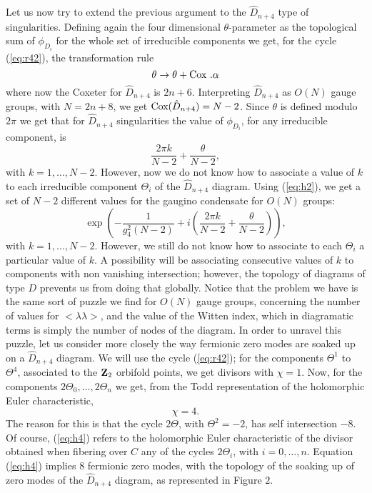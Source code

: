 Let us now try to extend the previous argument to the
$\hat{D}_{n+4}$ type of singularities. Defining again the four
dimensional $\theta$-parameter as the topological sum of
$\phi_{D_i}$ for the whole set of irreducible components we get,
for the cycle (\ref{eq:r42}), the transformation rule
\begin{equation}
\theta \rightarrow \theta + \hbox {Cox }. \alpha
\label{eq:h1}
\end{equation}
where now the Coxeter for $\hat{D}_{n+4}$ is $2n+6$. Interpreting
$\hat{D}_{n+4}$ as $O(N)$ gauge groups, with $N=2n+8$, we get
$\hbox {Cox}(\hat{D}_{n+4})=N-2$. Since $\theta$ is defined
modulo $2 \pi$ we get that for $\hat{D}_{n+4}$ singularities the
value of $\phi_{D_i}$, for any irreducible component, is
\begin{equation}
\frac {2 \pi k}{N-2} + \frac {\theta}{N-2},
\label{eq:h2}
\end{equation}
with $k=1, \ldots, N-2$. However, now we do not know how to
associate a value of $k$ to each irreducible component $\Theta_i$
of the $\hat{D}_{n+4}$ diagram. Using (\ref{eq:h2}), we get a set
of $N-2$ different values for the gaugino condensate for $O(N)$
groups:
\begin{equation}
\exp \left( - \frac {1}{g_4^2(N-2)} + i \left( \frac {2 \pi
k}{N-2} + \frac {\theta}{N-2} \right) \right),
\label{eq:h3}
\end{equation}
with $k=1,\ldots,N-2$. However, we still do not know how to
associate to each $\Theta_i$ a particular value of $k$. A
possibility will be associating consecutive values of $k$ to
components with non vanishing intersection; however, the topology
of diagrams of type $D$ prevents us from doing that globally.
Notice that the problem we have is the same sort of puzzle we
find for $O(N)$ gauge groups, concerning the number of values for
$<\lambda \lambda>$, and the value of the Witten index, which in
diagramatic terms is simply the number of nodes of the diagram.
In order to unravel this puzzle, let us consider more closely the
way fermionic zero modes are soaked up on a $\hat{D}_{n+4}$
diagram. We will use the cycle (\ref{eq:r42}); for the components
$\Theta^1$ to $\Theta^4$, associated to the ${\bf Z}_2$ orbifold
points, we get divisors with $\chi=1$. Now, for the components $2
\Theta_0, \ldots, 2 \Theta_n$ we get, from the Todd
representation of the holomorphic Euler characteristic,
\begin{equation}
\chi=4.
\label{eq:h4}
\end{equation}
The reason for this is that the cycle $2 \Theta$, with
$\Theta^2=-2$, has self intersection $-8$. Of course,
(\ref{eq:h4}) refers to the holomorphic Euler characteristic of
the divisor obtained when fibering over $C$ any of the cycles $2
\Theta_i$, with $i=0, \ldots, n$. Equation (\ref{eq:h4}) implies
$8$ fermionic zero modes, with the topology of the soaking up of zero modes of
the $\hat{D}_{n+4}$ diagram, as represented in Figure
$2$.

